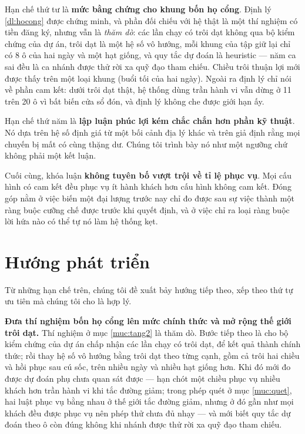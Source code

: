Hạn chế thứ tư là \textbf{mức bằng chứng cho khung bốn họ cổng}. Định lý \ref{dl:hocong} được
chứng minh, và phần đối chiếu với hệ thật là một thí nghiệm có tiền đăng ký, nhưng vẫn là
\emph{thăm dò}: các lần chạy có trôi dạt không qua bộ kiểm chứng của dự án, trôi dạt là một hệ số vô
hướng, mỗi khung của tập giữ lại chỉ có 8 ô của hai ngày và một hạt giống, và quy tắc dự đoán là
heuristic --- năm ca sai đều là ca nhánh được thử rời xa quỹ đạo tham chiếu. Chiều trôi thuận lợi
mới được thấy trên một loại khung (buổi tối của hai ngày). Ngoài ra định lý chỉ nói về phần cam kết: dưới trôi dạt thật,
hệ thống dùng trần hành vi vẫn dừng ở 11 trên 20 ô vì bất biến cửa sổ đón, và định lý không che
được giới hạn ấy.

Hạn chế thứ năm là \textbf{lập luận phúc lợi kém chắc chắn hơn phần kỹ thuật}. Nó dựa trên hệ số
định giá từ một bối cảnh địa lý khác và trên giả định rằng mọi chuyến bị mất có cùng thặng dư.
Chúng tôi trình bày nó như một ngưỡng chứ không phải một kết luận.

Cuối cùng, khóa luận \textbf{không tuyên bố vượt trội về tỉ lệ phục vụ}. Mọi cấu hình có cam
kết đều phục vụ ít hành khách hơn cấu hình không cam kết. Đóng góp nằm ở việc biến một đại
lượng trước nay chỉ đo được sau sự việc thành một ràng buộc cưỡng chế được trước khi quyết
định, và ở việc chỉ ra loại ràng buộc lời hứa nào có thể tự nó làm hệ thống kẹt.

\section{Hướng phát triển}

Từ những hạn chế trên, chúng tôi đề xuất bảy hướng tiếp theo, xếp theo thứ tự ưu tiên mà chúng
tôi cho là hợp lý.

\textbf{Đưa thí nghiệm bốn họ cổng lên mức chính thức và mở rộng thế giới trôi dạt.} Thí nghiệm ở
mục \ref{muc:tang2} là thăm dò. Bước tiếp theo là cho bộ kiểm chứng của dự án chấp nhận các lần chạy
có trôi dạt, để kết quả thành chính thức; rồi thay hệ số vô hướng bằng trôi dạt theo từng cạnh, gồm
cả trôi hai chiều và hồi phục sau cú sốc, trên nhiều ngày và nhiều hạt giống hơn. Khi đó mới đo được
dự đoán phụ chưa quan sát được --- hạn chót một chiều phục vụ nhiều khách hơn trần hành vi khi tắc
đường giảm; trong phép quét ở mục \ref{muc:quet}, hai luật phục vụ bằng nhau ở thế giới tắc đường
giảm, nhưng ở đó gần như mọi khách đều được phục vụ nên phép thử chưa đủ nhạy --- và mới biết quy tắc dự đoán theo ô còn đúng không khi nhánh được thử rời xa quỹ đạo
tham chiếu.

